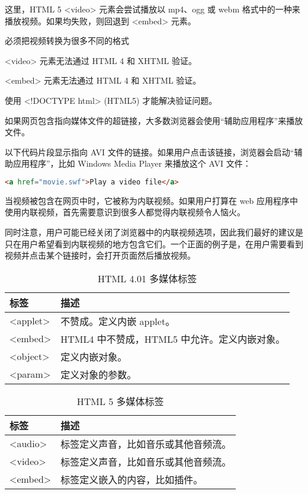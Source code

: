 这里，HTML 5 <video> 元素会尝试播放以 mp4、ogg 或 webm 格式中的一种来播放视频。如果均失败，则回退到 <embed> 元素。

\begin{compactitem}
\item 必须把视频转换为很多不同的格式
\item <video> 元素无法通过 HTML 4 和 XHTML 验证。
\item <embed> 元素无法通过 HTML 4 和 XHTML 验证。
\item 使用 <!DOCTYPE html> (HTML5) 才能解决验证问题。
\end{compactitem}

如果网页包含指向媒体文件的超链接，大多数浏览器会使用“辅助应用程序”来播放文件。

以下代码片段显示指向 AVI 文件的链接。如果用户点击该链接，浏览器会启动“辅助应用程序”，比如 Windows Media Player 来播放这个 AVI 文件：

\begin{lstlisting}[language=HTML]
<a href="movie.swf">Play a video file</a>
\end{lstlisting}

当视频被包含在网页中时，它被称为内联视频。如果用户打算在 web 应用程序中使用内联视频，首先需要意识到很多人都觉得内联视频令人恼火。

同时注意，用户可能已经关闭了浏览器中的内联视频选项，因此我们最好的建议是只在用户希望看到内联视频的地方包含它们。一个正面的例子是，在用户需要看到视频并点击某个链接时，会打开页面然后播放视频。

\begin{table}[!h]
\centering
\caption{HTML 4.01 多媒体标签}
\begin{tabular}{|l|l|}
\hline
标签		&描述	\\
\hline
<applet>	&不赞成。定义内嵌 applet。\\
\hline
<embed>	&HTML4 中不赞成，HTML5 中允许。定义内嵌对象。\\
\hline
<object>	&定义内嵌对象。\\
\hline
<param>	&定义对象的参数。\\
\hline
\end{tabular}
\end{table}

\begin{table}
\centering
\caption{HTML 5 多媒体标签}
\begin{tabular}{|l|l|}
\hline
标签		&描述\\
\hline
<audio>	&标签定义声音，比如音乐或其他音频流。\\
\hline
<video>	&标签定义声音，比如音乐或其他音频流。\\
\hline
<embed>	&标签定义嵌入的内容，比如插件。\\
\hline
\end{tabular}
\end{table}

